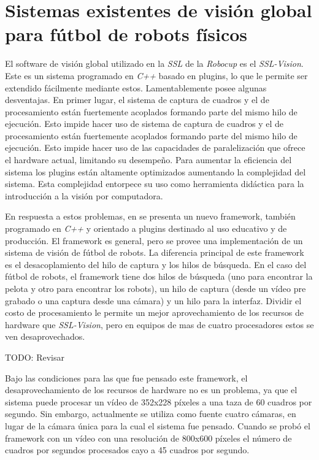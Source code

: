 
\section{Sistemas existentes de visión global para fútbol de robots físicos}


El software de visión global utilizado en la \emph{SSL} de la \emph{Robocup} es
el \emph{SSL-Vision}\cite{sslvision}. Este es un sistema programado en
\emph{C++} basado en plugins, lo que le permite ser extendido fácilmente
mediante estos. Lamentablemente posee algunas desventajas. En primer lugar, el
sistema de captura de cuadros y el de procesamiento están fuertemente acoplados
formando parte del mismo hilo de ejecución. Esto impide hacer uso de sistema de
captura de cuadros y el de procesamiento están fuertemente acoplados formando
parte del mismo hilo de ejecución. Esto impide hacer uso de las capacidades de
paralelización que ofrece el hardware actual, limitando su desempeño. Para
aumentar la eficiencia del sistema los plugins están altamente optimizados
aumentando la complejidad del sistema. Esta complejidad entorpece su uso como
herramienta didáctica para la introducción a la visión por computadora.


En respuesta a estos problemas, en \cite{torres2012, torres2014} se presenta un
nuevo framework, también programado en \emph{C++} y orientado a plugins
destinado al uso educativo y de producción. El framework es general, pero se
provee una implementación de un sistema de visión de fútbol de robots. La
diferencia principal de este framework es el desacoplamiento del hilo de captura
y los hilos de búsqueda. En el caso del fútbol de robots, el framework tiene dos
hilos de búsqueda (uno para encontrar la pelota y otro para encontrar los
robots), un hilo de captura (desde un vídeo pre grabado o una captura desde una
cámara) y un hilo para la interfaz. Dividir el costo de procesamiento le permite
un mejor aprovechamiento de los recursos de hardware que \emph{SSL-Vision}, pero
en equipos de mas de cuatro procesadores estos se ven desaprovechados.

TODO: Revisar

Bajo las condiciones para las que fue pensado este framework, el
desaprovechamiento de los recursos de hardware no es un problema, ya que el
sistema puede procesar un vídeo de 352x228 píxeles a una taza de 60 cuadros por
segundo. Sin embargo, actualmente se utiliza como fuente cuatro cámaras, en
lugar de la cámara única para la cual el sistema fue pensado. Cuando se probó el
framework con un vídeo con una resolución de 800x600 píxeles el número de
cuadros por segundos procesados cayo a 45 cuadros por segundo.
